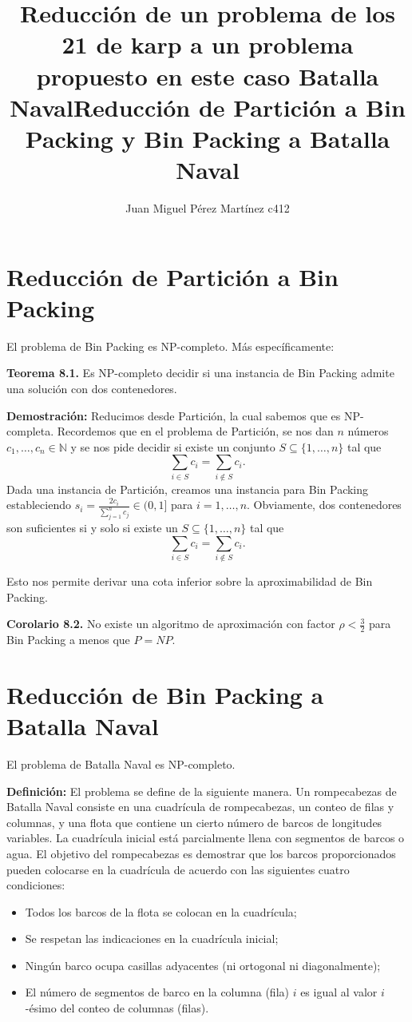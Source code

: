 \documentclass{article}
\title{Reducción de un problema de los 21 de karp a un problema propuesto en este caso Batalla Naval}
\title{Reducción de Partición a Bin Packing y Bin Packing a Batalla Naval}
\author{Juan Miguel Pérez Martínez c412}
\begin{document}
\maketitle

\section{Reducción de Partición a Bin Packing}

El problema de Bin Packing es NP-completo. Más específicamente:

\textbf{Teorema 8.1.} Es NP-completo decidir si una instancia de Bin Packing admite una solución con dos contenedores.

\textbf{Demostración:} Reducimos desde Partición, la cual sabemos que es NP-completa. Recordemos que en el problema de Partición, se nos dan $n$ números $c_1, \dots, c_n \in \mathbb{N}$ y se nos pide decidir si existe un conjunto $S \subseteq \{1, \dots, n\}$ tal que
\[
\sum_{i \in S} c_i = \sum_{i \notin S} c_i.
\]
Dada una instancia de Partición, creamos una instancia para Bin Packing estableciendo $s_i = \frac{2c_i}{\sum_{j=1}^{n} c_j} \in (0, 1]$ para $i = 1, \dots, n$. Obviamente, dos contenedores son suficientes si y solo si existe un $S \subseteq \{1, \dots, n\}$ tal que
\[
\sum_{i \in S} c_i = \sum_{i \notin S} c_i.
\]

Esto nos permite derivar una cota inferior sobre la aproximabilidad de Bin Packing.

\textbf{Corolario 8.2.} No existe un algoritmo de aproximación con factor $\rho < \frac{3}{2}$ para Bin Packing a menos que $P = NP$.

\section{Reducción de Bin Packing a Batalla Naval}

El problema de Batalla Naval es NP-completo.

\textbf{Definición:} El problema se define de la siguiente manera. Un rompecabezas de Batalla Naval consiste en una cuadrícula de rompecabezas, un conteo de filas y columnas, y una flota que contiene un cierto número de barcos de longitudes variables. La cuadrícula inicial está parcialmente llena con segmentos de barcos o agua. El objetivo del rompecabezas es demostrar que los barcos proporcionados pueden colocarse en la cuadrícula de acuerdo con las siguientes cuatro condiciones:
\begin{itemize}
    \item Todos los barcos de la flota se colocan en la cuadrícula;
    \item Se respetan las indicaciones en la cuadrícula inicial;
    \item Ningún barco ocupa casillas adyacentes (ni ortogonal ni diagonalmente);
    \item El número de segmentos de barco en la columna (fila) $i$ es igual al valor $i$-ésimo del conteo de columnas (filas).
\end{itemize}
\end{document}
